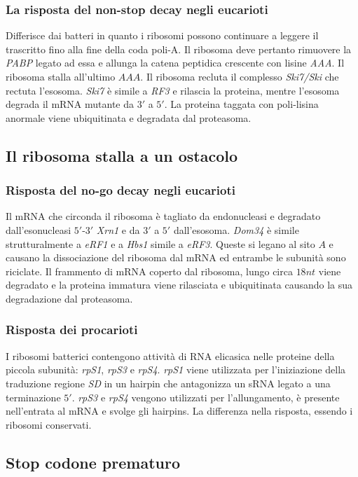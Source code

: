 \subsubsection{La risposta del non-stop decay negli eucarioti}
Differisce dai batteri in quanto i ribosomi possono continuare a leggere il trascritto fino alla fine della coda poli-A. Il ribosoma deve pertanto rimuovere la \emph{PABP} legato ad
essa e allunga la catena peptidica crescente con lisine \emph{AAA}. Il ribosoma stalla all'ultimo $AAA$. Il ribosoma recluta il complesso \emph{Ski7/Ski} che rectuta l'esosoma. 
\emph{Ski7} \`e simile a \emph{RF3} e rilascia la proteina, mentre l'esosoma degrada il mRNA mutante da $3'$ a $5'$. La proteina taggata con poli-lisina anormale viene ubiquitinata
e degradata dal proteasoma. 
\subsection{Il ribosoma stalla a un ostacolo}
\subsubsection{Risposta del no-go decay negli eucarioti}
Il mRNA che circonda il ribosoma \`e tagliato da endonucleasi e degradato dall'esonucleasi $5'$-$3'$ \emph{Xrn1} e da $3'$ a $5'$ dall'esosoma. \emph{Dom34} \`e
simile strutturalmente a \emph{eRF1} e a \emph{Hbs1} simile a \emph{eRF3}. Queste si legano al sito $A$ e causano la dissociazione del ribosoma dal mRNA ed entrambe le subunit\`a 
sono riciclate. Il frammento di mRNA coperto dal ribosoma, lungo circa $18nt$ viene degradato e la proteina immatura viene rilasciata e ubiquitinata causando la sua degradazione dal
proteasoma. 
\subsubsection{Risposta dei procarioti}
I ribosomi batterici contengono attivit\`a di RNA elicasica nelle proteine della piccola subunit\`a: \emph{rpS1}, \emph{rpS3} e \emph{rpS4}. \emph{rpS1} viene utilizzata per l'iniziazione
della traduzione regione \emph{SD} in un hairpin che antagonizza un sRNA legato a una terminazione $5'$. \emph{rpS3} e \emph{rpS4} vengono utilizzati per l'allungamento, \`e presente
nell'entrata al mRNA e svolge gli hairpins. La differenza nella risposta, essendo i ribosomi conservati.
\subsection{Stop codone prematuro}
